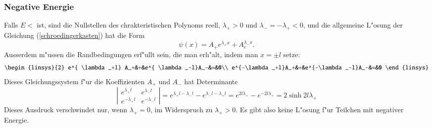 \subsubsection{Negative Energie}
Falls $E<$ ist, sind die Nullstellen des chrakteristischen
Polynoms reell, $\lambda_+>0$ und $\lambda_-=-\lambda_+ < 0$,
und die allgemeine 
L"osung der Gleichung (\ref{schroedingerkasten}) hat die Form
\[
\psi(x)=A_+e^{\lambda_+x}+A_e^{\lambda_-x}.
\]
Ausserdem m"ussen die Randbedingungen erf"ullt sein, die man erh"alt,
indem man $x=\pm l$ setze:
\[
\begin{linsys}{2}
e^{ \lambda_+l} A_+&+&e^{ \lambda_-l}A_-&=&0\\
e^{-\lambda_+l}A_+&+&e^{-\lambda_-l}A_-&=&0
\end{linsys}
\]
Dieses Gleichungssystem f"ur die Koeffizienten $A_+$ und $A_-$ hat
Determinante
\[
\left|\begin{matrix}
e^{ \lambda_+l}&e^{ \lambda_-l}\\
e^{-\lambda_+l}&e^{-\lambda_-l}
\end{matrix}\right|
=
e^{\lambda_+l-\lambda_-l}-e^{\lambda_-l-\lambda_+l}
=
e^{2l\lambda_+}-e^{-2l\lambda_+}
=
2\sinh 2l\lambda_+
\]
Dieses Ausdruck verschwindet nur, wenn $\lambda_+=0$, im Widerspruch
zu $\lambda_+>0$.
Es gibt also keine L"osung f"ur Teilchen mit negativer Energie.

